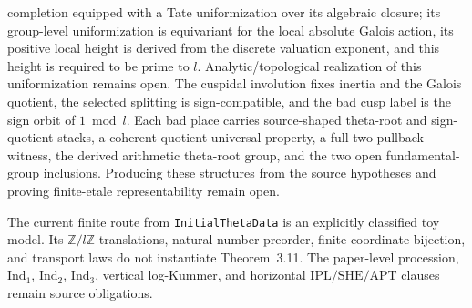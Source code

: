 \documentclass[11pt]{article}
\newcommand{\IndOne}{\ensuremath{\mathrm{Ind}_1}}
\newcommand{\IndTwo}{\ensuremath{\mathrm{Ind}_2}}
\newcommand{\IndThree}{\ensuremath{\mathrm{Ind}_3}}
\newcommand{\SHE}{\ensuremath{\mathrm{SHE}}}
\newcommand{\IPL}{\ensuremath{\mathrm{IPL}}}
\newcommand{\APT}{\ensuremath{\mathrm{APT}}}
\theoremstyle{plain}
\theoremstyle{definition}
\theoremstyle{remark}
\begin{document}
completion equipped with a Tate uniformization over its algebraic closure; its
group-level uniformization is equivariant for the local absolute Galois action,
its positive local height is derived from the discrete valuation exponent,
and this height is required to be prime to \(l\).
Analytic/topological realization of this uniformization remains open.
The cuspidal involution fixes inertia and the Galois quotient, the selected
splitting is sign-compatible, and the bad cusp label is the sign orbit of
\(1\bmod l\).  Each bad place carries source-shaped theta-root and
sign-quotient stacks, a coherent quotient universal property, a full
two-pullback witness, the derived arithmetic theta-root group, and the two
open fundamental-group inclusions.  Producing these structures from the
source hypotheses and proving finite-etale representability remain open.

The current finite route from \texttt{InitialThetaData} is an explicitly
classified toy model. Its \(\mathbb Z/l\mathbb Z\) translations,
natural-number preorder, finite-coordinate bijection, and transport laws do
not instantiate Theorem~3.11. The paper-level procession, \(\IndOne\),
\(\IndTwo\), \(\IndThree\), vertical log-Kummer, and horizontal
\(\IPL/\SHE/\APT\) clauses remain source obligations.
\end{document}
